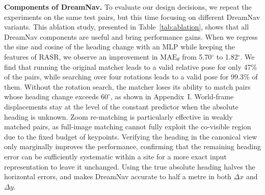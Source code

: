 \noindent \textbf{Components of DreamNav.} To evaluate our design decisions, we repeat the experiments on the same test pairs, but this time focusing on different DreamNav variants. This ablation study, presented in Table~\ref{tab:ablation}, shows that all DreamNav components are useful and bring performance gains. When we regress the sine and cosine of the heading change with an MLP while keeping the features of RASR, we observe an improvement in $\mathrm{MAE}_\theta$ from 5.70$^\circ$ to 1.82$^\circ$. We find that running the original matcher leads to a valid relative pose for only 47\% of the pairs, while searching over four rotations leads to a valid pose for 99.3\% of them. Without the rotation search, the matcher loses its ability to match pairs whose heading change exceeds $60^\circ$, as shown in Appendix~I. World-frame displacements stay at the level of the constant predictor when the absolute heading is unknown. Zoom re-matching is particularly effective in weakly matched pairs, as full-image matching cannot fully exploit the co-visible region due to the fixed budget of keypoints. Verifying the heading in the canonical view only marginally improves the performance, confirming that the remaining heading error can be sufficiently systematic within a site for a more exact input representation to leave it unchanged. Using the true absolute heading halves the horizontal errors, and makes DreamNav accurate to half a metre in both $\Delta x$ and $\Delta y$.

